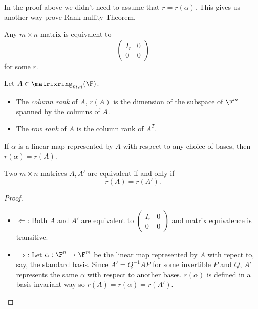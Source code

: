 \documentclass[a4paper]{article}
\newcommand*{\M}{\matrixring}
\theoremstyle{definition}
\begin{document}
\begin{remark}
  In the proof above we didn't need to assume that \(r = r(\alpha)\). This gives us another way prove Rank-nullity Theorem.
\end{remark}

\begin{corollary}
  Any \(m\times n\) matrix is equivalent to
  \[
  \begin{pmatrix}
      I_r & 0 \\
      0 & 0
    \end{pmatrix}
  \]
  for some \(r\).
\end{corollary}

\begin{definition}
  Let \(A\in \M_{m,n}(\F)\).
  \begin{itemize}
  \item The \emph{column rank} of \(A\), \(r(A)\) is the dimension of the subspace of \(\F^m\) spanned by the columns of \(A\).
  \item The \emph{row rank} of \(A\) is the column rank of \(A^T\).
  \end{itemize}
\end{definition}

\begin{note}
  If \(\alpha\) is a linear map represented by \(A\) with respect to any choice of bases, then \(r(\alpha) = r(A)\).
\end{note}

\begin{proposition}
  Two \(m\times n\) matrices \(A, A'\) are equivalent if and only if
  \[
    r(A) = r(A').
  \]
\end{proposition}

\begin{proof}\leavevmode
  \begin{itemize}
  \item \(\Leftarrow\): Both \(A\) and \(A'\) are equivalent to \(
    \begin{pmatrix}
      I_r & 0 \\
      0 & 0
    \end{pmatrix}
    \) and matrix equivalence is transitive.
  \item \(\Rightarrow\): Let \(\alpha:\F^n\to \F^m\) be the linear map represented by \(A\) with repect to, say, the standard basis. Since \(A'=Q^{-1}AP\) for some invertible \(P\) and \(Q\), \(A'\) represents the same \(\alpha\) with respect to another bases. \(r(\alpha)\) is defined in a basis-invariant way so \(r(A) = r(\alpha) = r(A')\).
  \end{itemize}
\end{proof}
\end{document}
